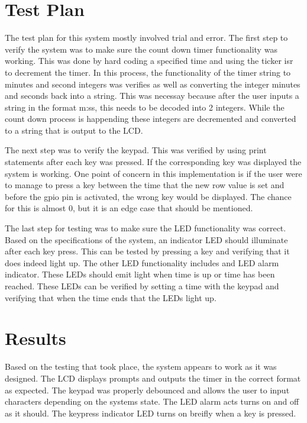 \documentclass{article}
\begin{document}
\section{Test Plan}
The test plan for this system mostly involved trial and error.  The first step to verify
the system was to make sure the count down timer functionality was working.  This was
done by hard coding a specified time and using the ticker isr to decrement the timer. 
In this process, the functionality of the timer string to minutes and second integers
was verifies as well as converting the integer minutes and seconds back into a string.  
This was necessay because after the user inputs a string in the format m:ss, this needs
to be decoded into 2 integers.  While the count down process is happending these integers
are decremented and converted to a string that is output to the LCD.
\newline

\noindent
The next step was to verify the keypad.  This was verified by using print statements 
after each key was pressed.  If the corresponding key was displayed the system is working.
One point of concern in this implementation is if the user were to manage to press a key 
between the time that the new row value is set and before the gpio pin is activated, the 
wrong key would be displayed.  The chance for this is almost 0, but it is an edge case 
that should be mentioned.
\newline

\noindent
The last step for testing was to make sure the LED functionality was correct.  Based on
the specifications of the system, an indicator LED should illuminate after each key press.
This can be tested by pressing a key and verifying that it does indeed light up.  The other
LED functionality includes and LED alarm indicator.  These LEDs should emit light when 
time is up or time has been reached.  These LEDs can be verified by setting a time
with the keypad and verifying that when the time ends that the LEDs light up.
\newline

\section{Results}
Based on the testing that took place, the system appears to work as it was designed.
The LCD displays prompts and outputs the timer in the correct format as expected.
The keypad was properly debounced and allows the user to input characters depending on
the systems state.  The LED alarm acts turns on and off as it should. The keypress indicator
LED turns on breifly when a key is pressed.
\newline
\end{document}
